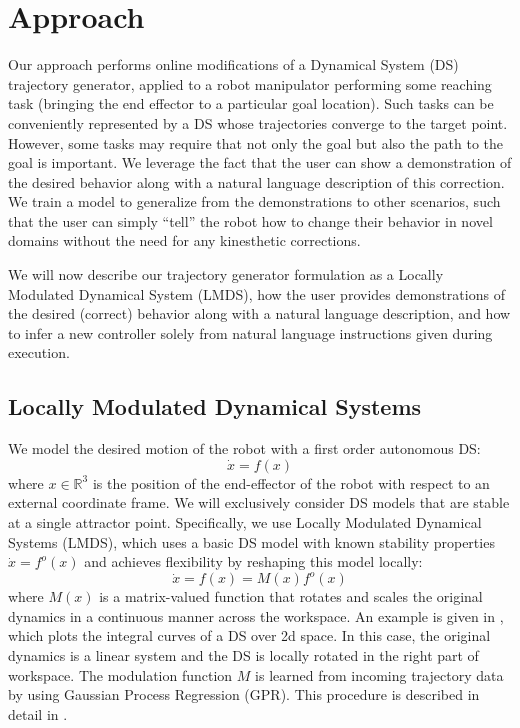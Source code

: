
\section{Approach}
\label{sec:approach}

Our approach performs online modifications of a Dynamical System (DS) trajectory generator, applied to a robot manipulator performing some reaching task (bringing the end effector to a particular goal location). 
Such tasks can be conveniently represented by a DS whose trajectories converge to the target point.
However, some tasks may require that not only the goal but also the path to the goal is important. 
We leverage the fact that the user can show a demonstration of the desired behavior along with a natural language description of this correction.
We train a model to generalize from the demonstrations to other scenarios, such that the user can simply ``tell'' the robot how to change their behavior in novel domains without the need for any kinesthetic corrections.

We will now describe our trajectory generator formulation as a Locally Modulated Dynamical System (LMDS), how the user provides demonstrations of the desired (correct) behavior along with a natural language description, and how to infer a new controller solely from natural language instructions given during execution.

\subsection{Locally Modulated Dynamical Systems}

We model the desired motion of the robot with a first order autonomous DS:
\begin{equation}
  \label{eq:DS_general}
  \dot x = f(x)
\end{equation}
where $x \in \mathbb{R}^3$ is the position of the end-effector of the robot with respect to an external coordinate frame.
We will exclusively consider DS models that are stable at a single attractor point.
Specifically, we use Locally Modulated Dynamical Systems (LMDS), which uses a basic DS model with known stability properties $\dot x = f^o(x)$ and achieves flexibility by reshaping this model locally:
\begin{equation}
  \label{eq:DS_reshaped}
  \dot x = f(x) = M(x)f^o(x)
\end{equation}
where $M(x)$ is a matrix-valued function that rotates and scales the original dynamics in a continuous manner across the workspace.
An example is given in , which plots the integral curves of a DS over 2d space.
In this case, the original dynamics is a linear system and the DS is locally rotated in the right part of workspace.
The modulation function $M$ is learned from incoming trajectory data by using Gaussian Process Regression (GPR).
 This procedure is described in detail in \cite{Kronander2015}. 


